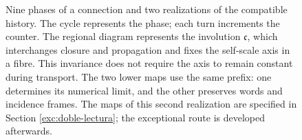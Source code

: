 \begin{figure}[H]
\caption{\fontsize{9}{11}\selectfont Nine phases of a connection and two realizations of the compatible
history. The cycle represents the phase; each turn increments the counter.
The regional diagram represents the involution \(\mathfrak c\), which
interchanges closure and propagation and fixes the self-scale axis in a fibre.
This invariance does not require the axis to remain constant during transport.
The two lower maps use the same prefix: one determines
its numerical limit, and the other preserves words and incidence frames. The
maps of this second realization are specified in Section
\ref{exc:doble-lectura}; the exceptional route is developed afterwards.}
\label{mono-ampl:fig-regional}
\end{figure}
